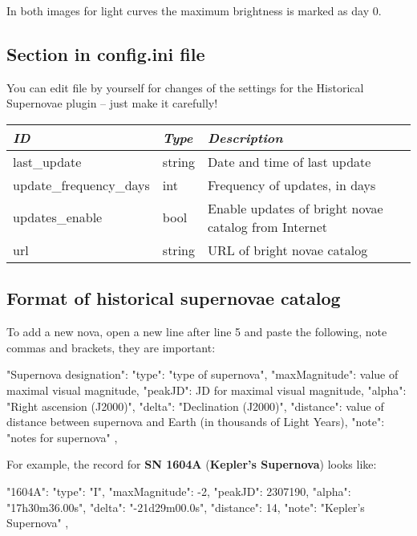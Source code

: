 In both images for light curves the maximum brightness is marked as day 0.

\subsection{Section  in config.ini file}
\label{sec:plugins:HistoricalSupernovae:config}

You can edit  file by yourself for changes of the
settings for the Historical Supernovae plugin -- just make it carefully!

\begin{longtabu} to \textwidth {l|l|X}\toprule
\emph{ID}            & \emph{Type} & \emph{Description}\\\midrule
last\_update            & string & Date and time of last update\\\midrule
update\_frequency\_days & int    & Frequency of updates, in days\\\midrule
updates\_enable         & bool   & Enable updates of bright novae catalog from Internet \\\midrule
url                     & string & URL of bright novae catalog \\\bottomrule
\end{longtabu}

\subsection{Format of historical supernovae catalog}
\label{sec:plugins:HistoricalSupernovae:format}

To add a new nova, open a new line after line 5 and paste the following, note commas and brackets, they are important:

\begin{configfile}
"Supernova designation":
{
    "type": "type of supernova",
    "maxMagnitude": value of maximal visual magnitude,
    "peakJD": JD for maximal visual magnitude,
    "alpha": "Right ascension (J2000)",
    "delta": "Declination (J2000)",
    "distance": value of distance between supernova and 
                Earth (in thousands of Light Years),
    "note": "notes for supernova"
},
\end{configfile}

\noindent For example, the record for \textbf{SN 1604A} (\textbf{Kepler's Supernova}) looks like:
\begin{configfile}
"1604A":
{
    "type": "I",
    "maxMagnitude": -2,
    "peakJD": 2307190,
    "alpha": "17h30m36.00s",
    "delta": "-21d29m00.0s",
    "distance": 14,
    "note": "Kepler's Supernova"
},
\end{configfile}

